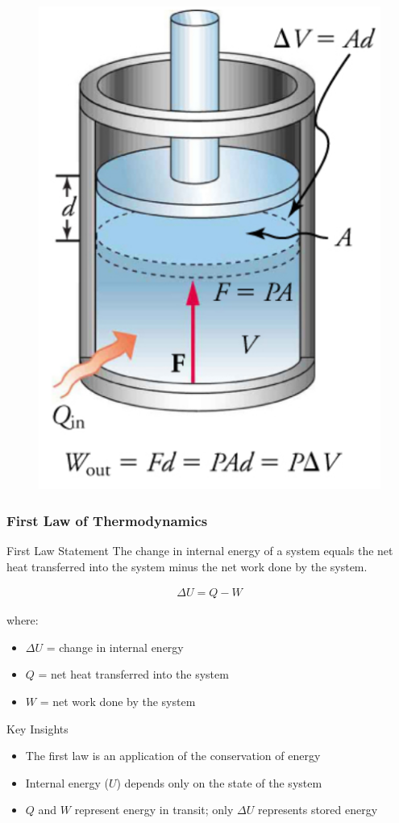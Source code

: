 \documentclass{beamer}
\begin{document}
\begin{frame}
\begin{figure}
    \centering
    \includegraphics[width=0.4\linewidth]{phys11-thermo-work-done-by-gas-piston.png}
\end{figure}
\end{frame}

\begin{frame}
    \frametitle{First Law of Thermodynamics}
    \begin{alertblock}{First Law Statement}
        The change in internal energy of a system equals the net heat transferred into the system minus the net work done by the system.
        
        \begin{align*}
            \Delta U = Q - W
        \end{align*}
        
        where:
        \begin{itemize}
            \item $\Delta U$ = change in internal energy
            \item $Q$ = net heat transferred into the system
            \item $W$ = net work done by the system
        \end{itemize}
    \end{alertblock}
    \end{frame}

\begin{frame}
    \begin{block}{Key Insights}
        \begin{itemize}
            \item The first law is an application of the conservation of energy
            \item Internal energy ($U$) depends only on the state of the system
            \item $Q$ and $W$ represent energy in transit; only $\Delta U$ represents stored energy
        \end{itemize}
    \end{block}
\end{frame}
\end{document}
